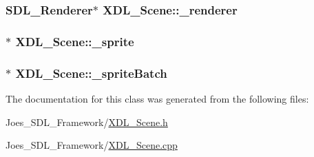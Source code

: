 \hypertarget{class_x_d_l___scene_a923ee55d91647c14f2566f1aa70e3aed}{
\subsubsection[{\-\_\-renderer}]{\setlength{\rightskip}{0pt plus 5cm}S\-D\-L\-\_\-\-Renderer$\ast$ X\-D\-L\-\_\-\-Scene\-::\-\_\-renderer\hspace{0.3cm}{\ttfamily [protected]}}}\label{class_x_d_l___scene_a923ee55d91647c14f2566f1aa70e3aed}
\hypertarget{class_x_d_l___scene_a92843792b25864d0aec748ca60213e24}{
\subsubsection[{\-\_\-sprite}]{$\ast$ X\-D\-L\-\_\-\-Scene\-::\-\_\-sprite}}\label{class_x_d_l___scene_a92843792b25864d0aec748ca60213e24}
\hypertarget{class_x_d_l___scene_acd40bb9e62e836e6a10bfd75b53b74b1}{
\subsubsection[{\-\_\-sprite\-Batch}]{$\ast$ X\-D\-L\-\_\-\-Scene\-::\-\_\-sprite\-Batch\hspace{0.3cm}{\ttfamily [protected]}}}\label{class_x_d_l___scene_acd40bb9e62e836e6a10bfd75b53b74b1}


The documentation for this class was generated from the following files\-:\begin{DoxyCompactItemize}
\item 
Joes\-\_\-\-S\-D\-L\-\_\-\-Framework/\hyperlink{_x_d_l___scene_8h}{X\-D\-L\-\_\-\-Scene.\-h}\item 
Joes\-\_\-\-S\-D\-L\-\_\-\-Framework/\hyperlink{_x_d_l___scene_8cpp}{X\-D\-L\-\_\-\-Scene.\-cpp}\end{DoxyCompactItemize}
